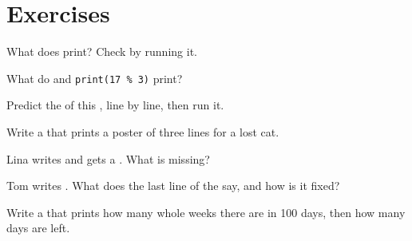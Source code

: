 \section{Exercises}

\begin{exercise}[$\star$]\label{exo:g6:first-python-program:1}
What does  print? Check by running it.
\end{exercise}

\begin{exercise}[$\star$]\label{exo:g6:first-python-program:2}
What do  and \texttt{print(17 \% 3)} print?
\end{exercise}

\begin{exercise}[$\star$]\label{exo:g6:first-python-program:3}
Predict the  of this , line by line, then run it.

\label{lst:g6:first-python-program:three-prints}
\end{exercise}

\begin{exercise}[$\star$]\label{exo:g6:first-python-program:4}
Write a   that prints a poster of three lines for a lost
cat.
\end{exercise}

\begin{exercise}[$\star\star$]\label{exo:g6:first-python-program:5}
Lina writes  and gets a . What is missing?
\end{exercise}

\begin{exercise}[$\star\star$]\label{exo:g6:first-python-program:6}
Tom writes . What does the last line of the  say,
and how is it fixed?
\end{exercise}

\begin{exercise}[$\star\star$]\label{exo:g6:first-python-program:7}
Write a   that prints how many whole weeks there are in
100 days, then how many days are left.
\end{exercise}

